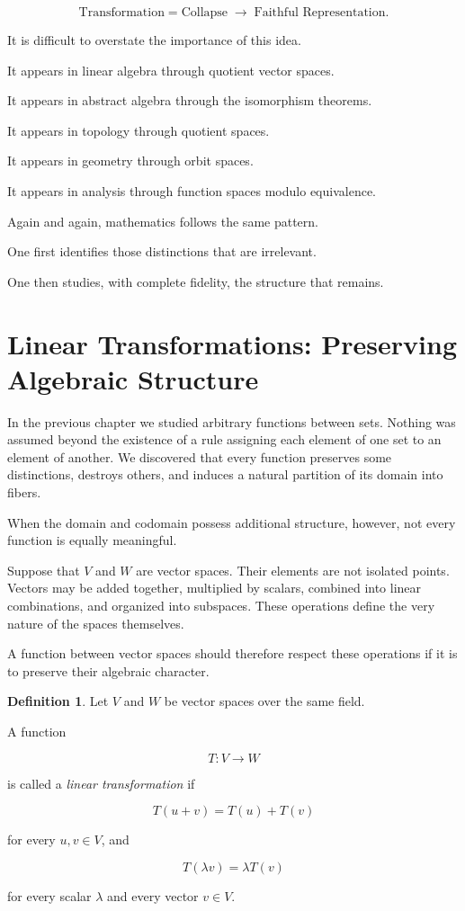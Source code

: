 \documentclass[11pt]{book}
\numberwithin{equation}{chapter}
\theoremstyle{definition}
\newtheorem{definition}{Definition}[chapter]
\theoremstyle{plain}
\theoremstyle{remark}
\begin{document}
\[
\boxed{
\text{Transformation}
=
\text{Collapse}
\;\longrightarrow\;
\text{Faithful Representation}.
}
\]

It is difficult to overstate the importance of this idea.

It appears in linear algebra through quotient vector spaces.

It appears in abstract algebra through the isomorphism theorems.

It appears in topology through quotient spaces.

It appears in geometry through orbit spaces.

It appears in analysis through function spaces modulo equivalence.

Again and again, mathematics follows the same pattern.

One first identifies those distinctions that are irrelevant.

One then studies, with complete fidelity, the structure that remains.


\section{Linear Transformations: Preserving Algebraic Structure}

In the previous chapter we studied arbitrary functions between sets. Nothing was assumed beyond the existence of a rule assigning each element of one set to an element of another. We discovered that every function preserves some distinctions, destroys others, and induces a natural partition of its domain into fibers.

When the domain and codomain possess additional structure, however, not every function is equally meaningful.

Suppose that \(V\) and \(W\) are vector spaces. Their elements are not isolated points. Vectors may be added together, multiplied by scalars, combined into linear combinations, and organized into subspaces. These operations define the very nature of the spaces themselves.

A function between vector spaces should therefore respect these operations if it is to preserve their algebraic character.

\begin{definition}
Let \(V\) and \(W\) be vector spaces over the same field.

A function

\[
T:V\rightarrow W
\]

is called a \emph{linear transformation} if

\[
T(u+v)=T(u)+T(v)
\]

for every \(u,v\in V\), and

\[
T(\lambda v)=\lambda T(v)
\]

for every scalar \(\lambda\) and every vector \(v\in V\).
\end{definition}
\end{document}
